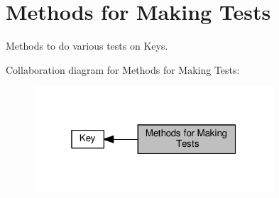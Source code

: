 \hypertarget{group__keytest}{}\section{Methods for Making Tests}
\label{group__keytest}


Methods to do various tests on Keys.  


Collaboration diagram for Methods for Making Tests\+:
\nopagebreak
\begin{figure}[H]
\begin{center}
\leavevmode
\includegraphics[width=253pt]{group__keytest}
\end{center}
\end{figure}
